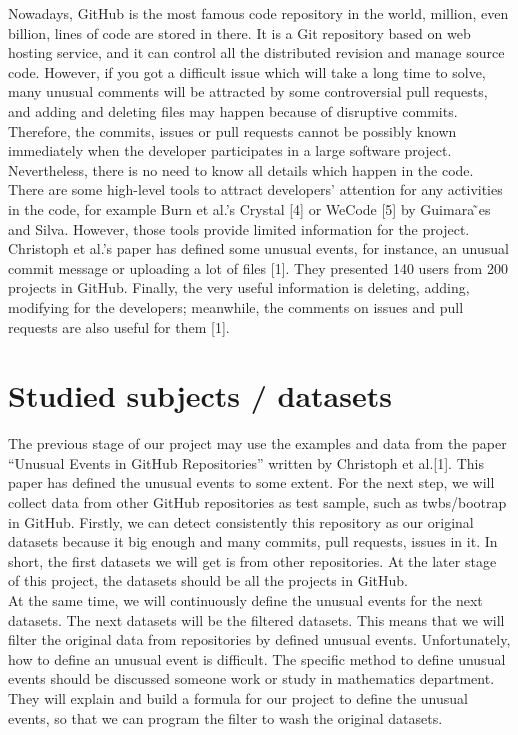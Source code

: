 \documentclass[conference]{IEEEtran}
\begin{document}
Nowadays, GitHub is the most famous code repository in the world, million, even billion, lines of code are stored in there. It is a Git repository based on web hosting service, and it can control all the distributed revision and manage source code. However, if you got a difficult issue which will take a long time to solve, many unusual comments will be attracted by some controversial pull requests, and adding and deleting files may happen because of disruptive commits.\\


Therefore, the commits, issues or pull requests cannot be possibly known immediately when the developer participates in a large software project. Nevertheless, there is no need to know all details which happen in the code. There are some high-level tools to attract developers’ attention for any activities in the code, for example Burn et al.’s Crystal [4] or WeCode [5] by Guimara ̃es and Silva. However, those tools provide limited information for the project.\\

Christoph et al.’s paper has defined some unusual events, for instance, an unusual commit message or uploading a lot of files [1]. They presented 140 users from 200 projects in GitHub. Finally, the very useful information is deleting, adding, modifying for the developers; meanwhile, the comments on issues and pull requests are also useful for them [1]. 



\section{Studied subjects / datasets}

The previous stage of our project may use the examples and data from the paper “Unusual Events in GitHub Repositories” written by Christoph et al.[1]. This paper has defined the unusual events to some extent. For the next step, we will collect data from other GitHub repositories as test sample, such as twbs/bootrap in GitHub. Firstly, we can detect consistently this repository as our original datasets because it big enough and many commits, pull requests, issues in it. In short, the first datasets we will get is from other repositories. At the later stage of this project, the datasets should be all the projects in GitHub.\\

At the same time, we will continuously define the unusual events for the next datasets. The next datasets will be the filtered datasets. This means that we will filter the original data from repositories by defined unusual events. Unfortunately, how to define an unusual event is difficult. The specific method to define unusual events should be discussed someone work or study in mathematics department. They will explain and build a formula for our project to define the unusual events, so that we can program the filter to wash the original datasets.
\end{document}
